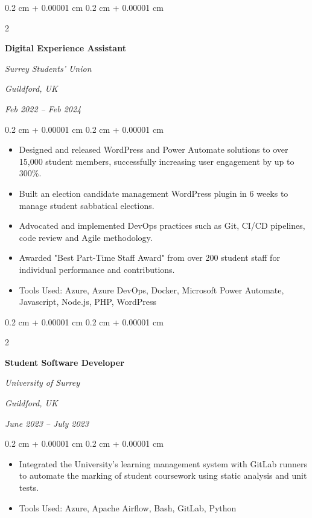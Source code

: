 \documentclass[10pt, letterpaper]{article}
\newenvironment{highlights}{
    \begin{itemize}[
        topsep=0.10 cm,
        parsep=0.10 cm,
        partopsep=0pt,
        itemsep=0pt,
        leftmargin=0.4 cm + 10pt
    ]
}{
    \end{itemize}
} %
\newenvironment{onecolentry}{
    \begin{adjustwidth}{
        0.2 cm + 0.00001 cm
    }{
        0.2 cm + 0.00001 cm
    }
}{
    \end{adjustwidth}
} %
\newenvironment{twocolentry}[2][]{
    \onecolentry
    \def\secondColumn{#2}
    \setcolumnwidth{\fill, 8 cm}
    \begin{paracol}{2}
}{
    \switchcolumn \raggedleft \secondColumn
    \end{paracol}
    \endonecolentry
} %
\begin{document}
        \vspace{0.2 cm}

        \begin{twocolentry}{
        \textit{Guildford, UK}    
            
        \textit{Feb 2022 – Feb 2024}}
            \textbf{Digital Experience Assistant}
            
            \textit{Surrey Students' Union}
        \end{twocolentry}

        \vspace{0.10 cm}
        \begin{onecolentry}
            \begin{highlights}
                \item Designed and released WordPress and Power Automate solutions to over 15,000 student members, successfully increasing user engagement by up to 300\%.
                \item Built an election candidate management WordPress plugin in 6 weeks to manage student sabbatical elections.
                \item Advocated and implemented DevOps practices such as Git, CI/CD pipelines, code review and Agile methodology.
                \item Awarded "Best Part-Time Staff Award" from over 200 student staff for individual performance and contributions.
                \item Tools Used: Azure, Azure DevOps, Docker, Microsoft Power Automate, Javascript, Node.js, PHP, WordPress
            \end{highlights}
        \end{onecolentry}


        \vspace{0.2 cm}

        \begin{twocolentry}{
        \textit{Guildford, UK}    
            
        \textit{June 2023 – July 2023}}
            \textbf{Student Software Developer}
            
            \textit{University of Surrey}
        \end{twocolentry}

        \vspace{0.10 cm}
        \begin{onecolentry}
            \begin{highlights}
                \item Integrated the University's learning management system with GitLab runners to automate the marking of student coursework using static analysis and unit tests.
                \item Tools Used: Azure, Apache Airflow, Bash, GitLab, Python
            \end{highlights}
        \end{onecolentry}
\end{document}

